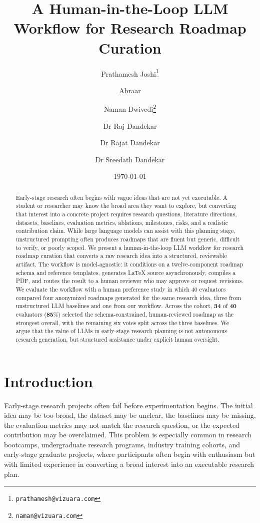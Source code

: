 \documentclass[11pt]{article}
\title{A Human-in-the-Loop LLM Workflow for Research Roadmap Curation}
\author[1]{Prathamesh Joshi\thanks{\texttt{prathamesh@vizuara.com}}}
\author[1]{Abraar}
\author[1]{Naman Dwivedi\thanks{\texttt{naman@vizuara.com}}}
\author[1]{Dr Raj Dandekar}
\author[1]{Dr Rajat Dandekar}
\author[1]{Dr Sreedath Dandekar}
\affil[1]{Vizuara AI Labs}
\date{\today}
\begin{document}
\maketitle

\begin{abstract}
Early-stage research often begins with vague ideas that are not yet executable. A student or researcher may know the broad area they want to explore, but converting that interest into a concrete project requires research questions, literature directions, datasets, baselines, evaluation metrics, ablations, milestones, risks, and a realistic contribution claim. While large language models can assist with this planning stage, unstructured prompting often produces roadmaps that are fluent but generic, difficult to verify, or poorly scoped. We present a human-in-the-loop LLM workflow for research roadmap curation that converts a raw research idea into a structured, reviewable artifact. The workflow is model-agnostic: it conditions on a twelve-component roadmap schema and reference templates, generates LaTeX source asynchronously, compiles a PDF, and routes the result to a human reviewer who may approve or request revisions. We evaluate the workflow with a human preference study in which $40$ evaluators compared four anonymized roadmaps generated for the same research idea, three from unstructured LLM baselines and one from our workflow. Across the cohort, $\textbf{34}$ of $\textbf{40}$ evaluators ($\textbf{85\%}$) selected the schema-constrained, human-reviewed roadmap as the strongest overall, with the remaining six votes split across the three baselines. We argue that the value of LLMs in early-stage research planning is not autonomous research generation, but structured assistance under explicit human oversight.
\end{abstract}


\section{Introduction}
\label{sec:intro}

Early-stage research projects often fail before experimentation begins. The initial idea may be too broad, the dataset may be unclear, the baselines may be missing, the evaluation metrics may not match the research question, or the expected contribution may be overclaimed. This problem is especially common in research bootcamps, undergraduate research programs, industry training cohorts, and early-stage graduate projects, where participants often begin with enthusiasm but with limited experience in converting a broad interest into an executable research plan.
\end{document}
